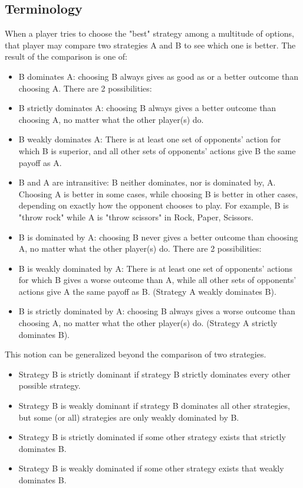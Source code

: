 \documentclass[]{report}
\begin{document}
\subsection{Terminology}
When a player tries to choose the "best" strategy among a multitude of options, that player may compare two strategies A and B to see which one is better. The result of the comparison is one of:
\begin{itemize}
\item B dominates A: choosing B always gives as good as or a better outcome than choosing A. There are 2 possibilities:
\item B strictly dominates A: choosing B always gives a better outcome than choosing A, no matter what the other player(s) do.
\item B weakly dominates A: There is at least one set of opponents' action for which B is superior, and all other sets of opponents' actions give B the same payoff as A.
\item B and A are intransitive: B neither dominates, nor is dominated by, A. Choosing A is better in some cases, while choosing B is better in other cases, depending on exactly how the opponent chooses to play. For example, B is "throw rock" while A is "throw scissors" in Rock, Paper, Scissors.
\item B is dominated by A: choosing B never gives a better outcome than choosing A, no matter what the other player(s) do. There are 2 possibilities:
\item B is weakly dominated by A: There is at least one set of opponents' actions for which B gives a worse outcome than A, while all other sets of opponents' actions give A the same payoff as B. (Strategy A weakly dominates B).
\item B is strictly dominated by A: choosing B always gives a worse outcome than choosing A, no matter what the other player(s) do. (Strategy A strictly dominates B).
\end{itemize}
This notion can be generalized beyond the comparison of two strategies.

\begin{itemize}
\item Strategy B is strictly dominant if strategy B strictly dominates every other possible strategy.
\item Strategy B is weakly dominant if strategy B dominates all other strategies, but some (or all) strategies are only weakly dominated by B.
\item Strategy B is strictly dominated if some other strategy exists that strictly dominates B.
\item Strategy B is weakly dominated if some other strategy exists that weakly dominates B.
\end{itemize}
\end{document}
